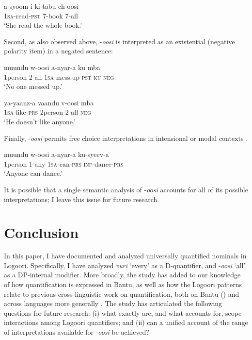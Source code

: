 \documentclass[output=paper]{langsci/langscibook}
\begin{document}
\ea\label{ex:landman:}
\gll a-syoom-i  ki-tabu  ch-oosi\\
     1\textsc{sa}-read-\textsc{pst}    7-book \textsc{7-}all \\
\glt ‘She read the whole book.’
\z

  Second, as also observed above, -\textit{oosi} is interpreted as an existential (negative polarity item) in a negated sentence:  

\ea\label{ex:landman:} 
\gll muundu  w-oosi    a-nyar-a    ku  mba  \\
     1person  2-all    1\textsc{sa}-mess.up-\textsc{pst}  \textsc{ku}  \textsc{neg}\\
\glt ‘No one messed up.’        
\z

\ea\label{ex:landman:}
\gll ya-yaanz-a  vaandu   v-oosi    mba \\
     1\textsc{sa}-like-\textsc{prs}  2person     2-all    \textsc{neg}\\
\glt ‘He doesn't like anyone.’
\z

  Finally, -\textit{oosi} permits free choice interpretations in intensional or modal contexts .

\ea\label{ex:landman:33}
\gll muundu  w-oosi    a-nyar-a  ku-syeev-a\\
     1person  1-any    1\textsc{sa}-can-\textsc{prs}  \textsc{inf-}dance-\textsc{prs} \\
\glt ‘Anyone can dance.’
\z

It is possible that a single semantic analysis of -\textit{oosi} accounts for all of its possible interpretations; I leave this issue for future research. 

\section{Conclusion}\label{sec:landman:5}

In this paper, I have documented and analyzed universally quantified nominals in Logoori. Specifically, I have analyzed \textit{vuri} ‘every’ as a D-quantifier, and -\textit{oosi} ‘all’ as a DP-internal modifier. More broadly, the study has added to our knowledge of how quantification is expressed in Bantu, as well as how the Logoori patterns relate to previous cross-linguistic work on quantification, both on Bantu (\citealt{ZerbianKrifka2008}) and across languages more generally \citep{Matthewson2013}. The study has articulated the following questions for future research: (i) what exactly are, and what accounts for, scope interactions among Logoori quantifiers; and (ii) can a unified account of the range of interpretations available for -\textit{oosi} be achieved?
\end{document}
